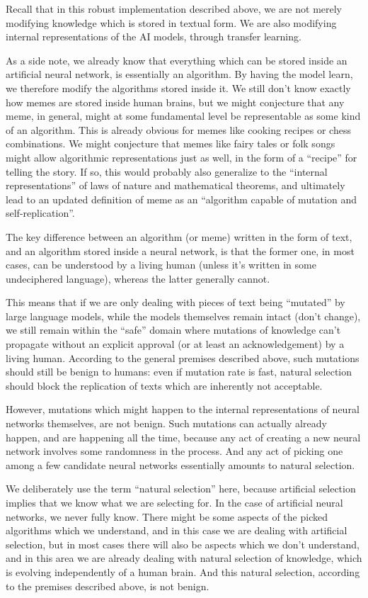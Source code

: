\documentclass[12pt]{article}
\begin{document}
Recall that in this robust implementation described above, we are not merely modifying
knowledge which is stored in textual form. We are also modifying internal representations
of the AI models, through transfer learning.

As a side note, we already know that everything which can be stored inside an artificial
neural network, is essentially an algorithm. By having the model learn, we therefore
modify the algorithms stored inside it. We still don't know exactly how memes are stored
inside human brains, but we might conjecture that any meme, in general, might at some
fundamental level be representable as some kind of an algorithm. This is already obvious
for memes like cooking recipes or chess combinations. We might conjecture that memes like
fairy tales or folk songs might allow algorithmic representations just as well, in the
form of a ``recipe'' for telling the story. If so, this would probably also generalize to
the ``internal representations'' of laws of nature and mathematical theorems, and
ultimately lead to an updated definition of meme as an ``algorithm capable of mutation
and self-replication''.

The key difference between an algorithm (or meme) written in the form of text, and an
algorithm stored inside a neural network, is that the former one, in most cases, can be
understood by a living human (unless it's written in some undeciphered language), whereas
the latter generally cannot.

This means that if we are only dealing with pieces of text being ``mutated'' by large
language models, while the models themselves remain intact (don't change), we still
remain within the ``safe'' domain where mutations of knowledge can't propagate without an
explicit approval (or at least an acknowledgement) by a living human. According to the
general premises described above, such mutations should still be benign to humans: even
if mutation rate is fast, natural selection should block the replication of texts which
are inherently not acceptable.

However, mutations which might happen to the internal representations of neural networks
themselves, are not benign. Such mutations can actually already happen, and are happening
all the time, because any act of creating a new neural network involves some randomness
in the process. And any act of picking one among a few candidate neural networks
essentially amounts to natural selection.

We deliberately use the term ``natural selection'' here, because artificial selection
implies that we know what we are selecting for. In the case of artificial neural
networks, we never fully know. There might be some aspects of the picked algorithms which
we understand, and in this case we are dealing with artificial selection, but in most
cases there will also be aspects which we don't understand, and in this area we are
already dealing with natural selection of knowledge, which is evolving independently of a
human brain. And this natural selection, according to the premises described above, is
not benign.
\end{document}
